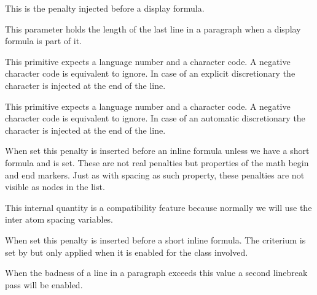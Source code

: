\startoldprimitive[title={\prm {predisplaypenalty}}]

This is the penalty injected before a display formula.

\stopoldprimitive

\startoldprimitive[title={\prm {predisplaysize}}]

This parameter holds the length of the last line in a paragraph when a display
formula is part of it.

\stopoldprimitive

\startnewprimitive[title={\prm {preexhyphenchar}}]

This primitive expects a language number and a character code. A negative
character code is equivalent to ignore. In case of an explicit discretionary the
character is injected at the end of the line.

\stopnewprimitive

\startnewprimitive[title={\prm {prehyphenchar}}]

This primitive expects a language number and a character code. A negative
character code is equivalent to ignore. In case of an automatic discretionary the
character is injected at the end of the line.

\stopnewprimitive

\startnewprimitive[title={\prm {preinlinepenalty}}]

When set this penalty is inserted before an inline formula unless we have a short
formula and  is set. These are not real penalties but
properties of the math begin and end markers. Just as with spacing as such
property, these penalties are not visible as nodes in the list.

\stopnewprimitive

\startnewprimitive[title={\prm {prerelpenalty}}]

This internal quantity is a compatibility feature because normally we will use
the inter atom spacing variables.

\stopnewprimitive

\startnewprimitive[title={\prm {preshortinlinepenalty}}]

When set this penalty is inserted before a short inline formula. The criterium is
set by  but only applied when it is enabled for
the class involved.

\stopnewprimitive

\startoldprimitive[title={\prm {pretolerance}}]

When the badness of a line in a paragraph exceeds this value a second linebreak
pass will be enabled.

